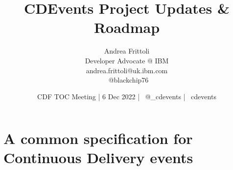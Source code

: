 \documentclass[aspectratio=169,11pt,hyperref={colorlinks=true}]{beamer}
\title{CDEvents Project Updates \& Roadmap}
\date[6 Dec 2022]{CDF TOC Meeting | 6 Dec 2022 | \faTwitter ~@\_cdevents | \faGithub ~cdevents}
\author[Andrea Frittoli]{%
  Andrea Frittoli \\
  Developer Advocate @ IBM\\
  andrea.frittoli@uk.ibm.com \\
  \faTwitter ~@blackchip76 \\
}
\begin{document}
\begin{frame}
\titlepage{}
\end{frame}



\section[CDEvents]{A common specification for Continuous Delivery events}
\begin{sectionwithpicmediumcentral}{}
\end{sectionwithpicmediumcentral}
\end{document}
